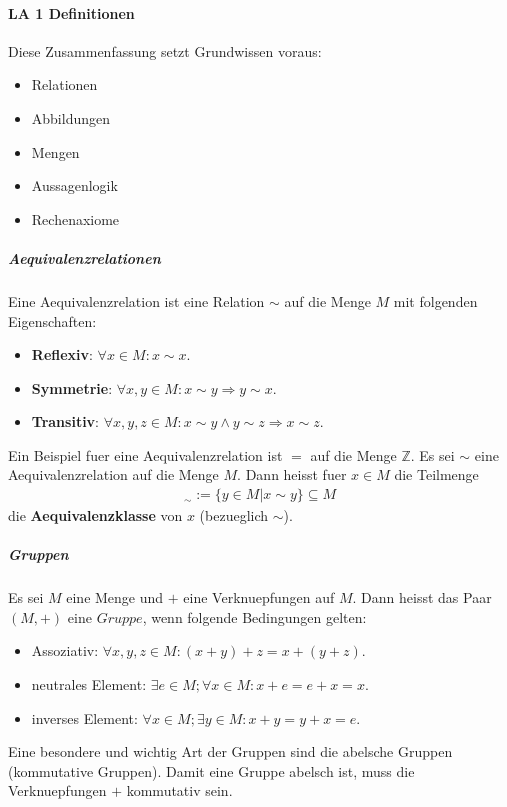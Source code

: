 \documentclass[12pt]{article}
\begin{document}
\paragraph{\Large LA 1 Definitionen}
\begin{flushleft}
    Diese Zusammenfassung setzt Grundwissen voraus:
    \begin{itemize}
        \item Relationen
        \item Abbildungen
        \item Mengen
        \item Aussagenlogik
        \item Rechenaxiome
    \end{itemize}
\end{flushleft}
\vspace{0.5cm}
\subparagraph{\large Aequivalenzrelationen}
\normalsize
\begin{flushleft}
    Eine Aequivalenzrelation ist eine Relation $\sim$ auf die Menge $M$ mit folgenden Eigenschaften:
    \begin{itemize}
        \item \textbf{Reflexiv}: $\forall x \in M: x \sim x$.
        \item \textbf{Symmetrie}: $\forall x,y \in M: x \sim y \Rightarrow y \sim x$.
        \item \textbf{Transitiv}: $\forall x,y,z \in M: x \sim y \land y \sim z \Rightarrow x \sim z$.
    \end{itemize}
    Ein Beispiel fuer eine Aequivalenzrelation ist $=$ auf die Menge $\mathbb{Z}$.
    \vspace{1cm}
    Es sei $\sim$ eine Aequivalenzrelation auf die Menge $M$. Dann heisst fuer $x \in M$ die Teilmenge
    \begin{align*}
        [x]_{\sim} := \{y \in M | x \sim y\} \subseteq M
    \end{align*}
    die \textbf{Aequivalenzklasse} von $x$ (bezueglich $\sim$).
\end{flushleft}
\vspace{1cm}
\subparagraph{\large Gruppen}
\normalsize
\begin{flushleft}
    Es sei $M$ eine Menge und $+$ eine Verknuepfungen auf $M$. Dann heisst das Paar $(M,+)$ eine $Gruppe$, wenn folgende Bedingungen gelten:
    \begin{itemize}
        \item Assoziativ: $\forall x,y,z \in M: (x + y) + z = x + (y + z)$.
        \item neutrales Element: $\exists e \in M; \forall x \in M: x + e = e + x = x$.
        \item inverses Element: $\forall x \in M; \exists y \in M: x + y = y + x = e$.
    \end{itemize}
    Eine besondere und wichtig Art der Gruppen sind die abelsche Gruppen (kommutative Gruppen).
    Damit eine Gruppe abelsch ist, muss die Verknuepfungen $+$ kommutativ sein.
\end{flushleft}
\end{document}
